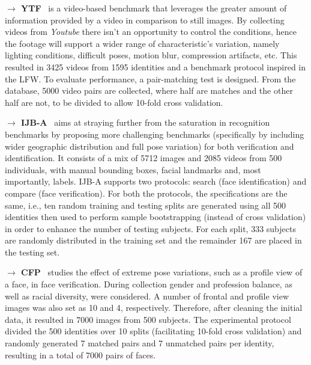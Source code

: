 \documentclass[class=report, crop=false, a4paper, 12pt]{standalone}
\begin{document}
\begin{appendix}
\vspace{0.7\baselineskip}
\noindent\textbf{$\rightarrow$ YTF}~\autocite{wolfFaceRecognitionUnconstrained2011} is a video-based benchmark that leverages the greater amount of information provided by a video in comparison to still images. By collecting videos from \textit{Youtube} there isn't an opportunity to control the conditions, hence the footage will support a wider range of characteristic's variation, namely lighting conditions, difficult poses, motion blur, compression artifacts, etc. This resulted in 3425 videos from 1595 identities and a benchmark protocol inspired in the LFW. To evaluate performance, a pair-matching test is designed. From the database, 5000 video pairs are collected, where half are matches and the other half are not, to be divided to allow 10-fold cross validation.

\vspace{0.7\baselineskip}
\noindent\textbf{$\rightarrow$ IJB-A}~\autocite{klarePushingFrontiersUnconstrained2015} aims at straying further from the saturation in recognition benchmarks by proposing more challenging benchmarks (specifically by including wider geographic distribution and full pose variation) for both verification and identification. It consists of a mix of 5712 images and 2085 videos from 500 individuals, with manual bounding boxes, facial landmarks and, most importantly, labels. IJB-A supports two protocols: search (face identification) and compare (face verification). For both the protocols, the specifications are the same, i.e., ten random training and testing splits are generated using all 500 identities then used to perform sample bootstrapping (instead of cross validation) in order to enhance the number of testing subjects. For each split, 333 subjects are randomly distributed in the training set and the remainder 167 are placed in the testing set.

\vspace{0.7\baselineskip}
\noindent\textbf{$\rightarrow$ CFP}~\autocite{senguptaFrontalProfileFace2016} studies the effect of extreme pose variations, such as a profile view of a face, in face verification. During collection gender and profession balance, as well as racial diversity, were considered. A number of frontal and profile view images was also set as 10 and 4, respectively. Therefore, after cleaning the initial data, it resulted in 7000 images from 500 subjects. The experimental protocol divided the 500 identities over 10 splits (facilitating 10-fold cross validation) and randomly generated 7 matched pairs and 7 unmatched pairs per identity, resulting in a total of 7000 pairs of faces.


\end{appendix}
\end{document}
